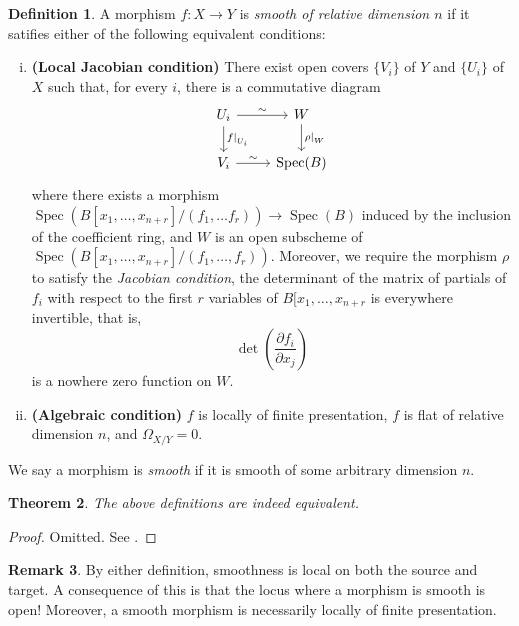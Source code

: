 \documentclass{amsart}
\DeclareMathOperator{\Spec}{Spec}
\newtheorem{theorem}{Theorem}[section]
\theoremstyle{definition}
\newtheorem{definition}[theorem]{Definition}
\newtheorem{remark}[theorem]{Remark}
\theoremstyle{remark}
\newcommand\restr[2]{{%
  \left.\kern-\nulldelimiterspace %
  #1 %
  \vphantom{|} %
  \right|_{#2} %
  }}
\begin{document}
\begin{definition}
    A morphism $f : X \to Y$ is \textit{smooth of relative dimension $n$} if it
    satifies either of the following equivalent conditions:
    \begin{enumerate}[(i)]
        \item \textbf{(Local Jacobian condition)}
            There exist open covers $\{V_i\}$ of $Y$ and $\{U_i\}$ of $X$ such
            that, for every $i$, there is a commutative diagram
            \[
                \begin{tikzcd}
                    U_i \ar[d, "\restr{f}{U_i}"] \ar[r, "\sim"] &
                    W \ar[d, "\restr{\rho}{W}"] \\
                    V_i \ar[r, "\sim"] &
                    \Spec(B)
                \end{tikzcd}
            \]
            where there exists a morphism $\Spec(B[x_1, \dots, x_{n+r}]/(f_1, \dots
            f_r)) \to \Spec(B)$ induced by the inclusion of the coefficient ring, and
            $W$ is an open subscheme of $\Spec(B[x_1, \dots, x_{n+r}]/(f_1, \dots,
            f_r))$. Moreover, we require the morphism $\rho$ to satisfy the
            \textit{Jacobian condition}, the determinant of the matrix of
            partials of $f_i$ with respect to the first $r$ variables of $B[x_1,
            \dots, x_{n+r}$ is everywhere invertible, that is,
            \[
                \det \left( \frac{\partial f_i}{\partial x_j} \right)
            \]
            is a nowhere zero function on $W$.

        \item \textbf{(Algebraic condition)} $f$ is locally of finite
            presentation, $f$ is flat of relative dimension $n$, and
            $\Omega_{X/Y} = 0$.

    \end{enumerate}

    We say a morphism is \textit{smooth} if it is smooth of some arbitrary
    dimension $n$.
\end{definition}

\begin{theorem}
    The above definitions are indeed equivalent.
\end{theorem}

\begin{proof}
    Omitted. See \cite{vakil}.
\end{proof}

\begin{remark}
    By either definition, smoothness is local on both the source and target. A
    consequence of this is that the locus where a morphism is smooth is open!
    Moreover, a smooth morphism is necessarily locally of finite presentation.
\end{remark}
\end{document}

